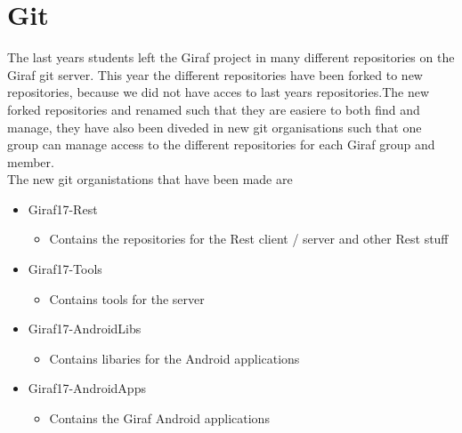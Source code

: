 \section{Git}
The last years students left the Giraf project in many different repositories on
the Giraf git server. This year the different repositories have been forked to
new repositories, because we did not have acces to last years repositories.The
new forked repositories and renamed such that they are easiere to both find and
manage, they have also been diveded in new git organisations such that one group 
can manage access to the different repositories for each Giraf group and member.\\

The new git organistations that have been made are 
\begin{itemize}
  \item Giraf17-Rest
  \begin{itemize}
  \item Contains the repositories for the Rest client / server and other Rest
  stuff
\end{itemize}
  \item Giraf17-Tools
  \begin{itemize}
  \item Contains tools for the server
\end{itemize}
  \item Giraf17-AndroidLibs
  \begin{itemize}
  \item Contains libaries for the Android applications
\end{itemize}
  \item Giraf17-AndroidApps
  \begin{itemize}
  \item Contains the Giraf Android applications 
\end{itemize}
\end{itemize}


